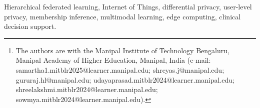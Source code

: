 \documentclass[journal]{IEEEtran}
\begin{document}
\else
\author{Samartha~H~V, Shreyas~J, Gururaj~H~L, Udayaprasad~P~K, Shreelakshmi~Yadav~N,
and Sowmya~T~Rao%
\thanks{\raggedright The authors are with the Manipal Institute of Technology Bengaluru,
Manipal Academy of Higher Education, Manipal, India (e-mail:
samartha1.mitblr2025@learner.manipal.edu;
shreyas.j@manipal.edu;
gururaj.hl@manipal.edu;
udayaprasad.mitblr2024@learner.manipal.edu;
shreelakshmi.mitblr2024@learner.manipal.edu;
sowmya.mitblr2024@learner.manipal.edu).}}
\fi


\maketitle



\begin{IEEEkeywords}
Hierarchical federated learning, Internet of Things, differential privacy,
user-level privacy, membership inference, multimodal learning, edge
computing, clinical decision support.
\end{IEEEkeywords}

\IEEEpeerreviewmaketitle













\end{document}
